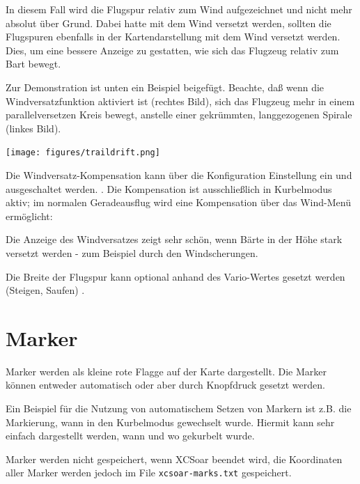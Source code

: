 In diesem Fall wird die Flugspur relativ zum Wind aufgezeichnet und nicht mehr absolut über Grund.
Dabei hatte mit dem Wind versetzt werden, sollten die Flugspuren ebenfalls in der Kartendarstellung mit dem Wind versetzt werden. Dies, um eine bessere Anzeige zu gestatten, wie sich das Flugzeug relativ zum Bart  bewegt.

Zur Demonstration ist unten ein Beispiel beigefügt. Beachte, daß wenn die Windversatzfunktion aktiviert ist (rechtes Bild), sich das Flugzeug mehr in einem parallelversetzen Kreis  bewegt, anstelle einer gekrümmten, langgezogenen Spirale (linkes Bild).

\begin{center}
\texttt{[image: figures/traildrift.png]}
\end{center}

Die Windversatz-Kompensation kann über die Konfiguration Einstellung ein und ausgeschaltet werden. .  Die Kompensation ist ausschließlich in Kurbelmodus aktiv; im normalen Geradeausflug wird eine Kompensation über das Wind-Menü ermöglicht:

\begin{quote}
\blink{}
\end{quote}

Die Anzeige des Windversatzes zeigt sehr schön, wenn Bärte in der Höhe stark versetzt werden - zum Beispiel durch den Windscherungen.

Die Breite der Flugspur  kann optional anhand des Vario-Wertes gesetzt werden (Steigen, Saufen) .

\section{Marker}


Marker werden als kleine rote Flagge auf der Karte dargestellt. Die Marker können entweder automatisch oder aber durch Knopfdruck gesetzt werden.

Ein Beispiel für die Nutzung von automatischem Setzen von Markern ist z.B. die Markierung, wann in den Kurbelmodus gewechselt wurde. Hiermit kann sehr einfach dargestellt werden, wann und wo gekurbelt wurde.

Marker werden nicht gespeichert, wenn \textsf{XCSoar} beendet wird, die Koordinaten aller Marker werden jedoch im File \verb|xcsoar-marks.txt| gespeichert.

